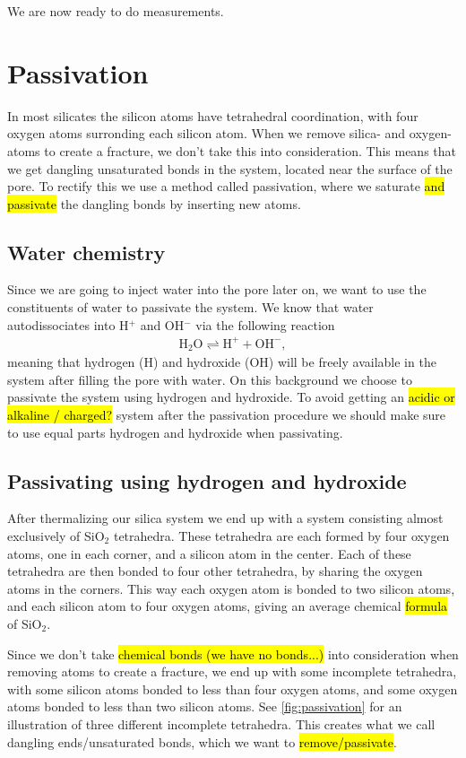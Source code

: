 We are now ready to do measurements.

\section{Passivation}
In most silicates the silicon atoms have tetrahedral coordination, with four oxygen atoms surronding each silicon atom. When we remove silica- and oxygen-atoms to create a fracture, we don't take this into consideration. This means that we get dangling unsaturated bonds in the system, located near the surface of the pore. To rectify this we use a method called passivation, where we saturate \hl{and passivate} the dangling bonds by inserting new atoms. 

\subsection{Water chemistry}
Since we are going to inject water into the pore later on, we want to use the constituents of water to passivate the system. We know that water autodissociates into H$^{+}$ and OH$^{-}$ via the following reaction
\begin{align*}
    \text{H}_2\text{O} \rightleftharpoons \text{H}^{+} + \text{OH}^{-},
\end{align*}
meaning that hydrogen (H) and hydroxide (OH) will be freely available in the system after filling the pore with water. On this background we choose to passivate the system using hydrogen and hydroxide. To avoid getting an \hl{acidic or alkaline / charged?} system after the passivation procedure we should make sure to use equal parts hydrogen and hydroxide when passivating.

\subsection{Passivating using hydrogen and hydroxide}
After thermalizing our silica system we end up with a system consisting almost exclusively of SiO$_2$ tetrahedra. These tetrahedra are each formed by four oxygen atoms, one in each corner, and a silicon atom in the center. Each of these tetrahedra are then bonded to four other tetrahedra, by sharing the oxygen atoms in the corners. This way each oxygen atom is bonded to two silicon atoms, and each silicon atom to four oxygen atoms, giving an average chemical \hl{formula} of SiO$_2$. 

Since we don't take \hl{chemical bonds (we have no bonds...)} into consideration when removing atoms to create a fracture, we end up with some incomplete tetrahedra, with some silicon atoms bonded to less than four oxygen atoms, and some oxygen atoms bonded to less than two silicon atoms. See \cref{fig:passivation} for an illustration of three different incomplete tetrahedra. This creates what we call dangling ends/unsaturated bonds, which we want to \hl{remove/passivate}.

